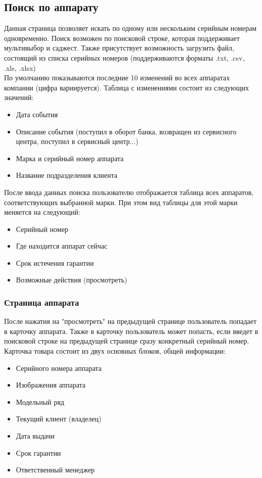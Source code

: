 \documentclass[DIV=calc, paper=a4, fontsize=11pt]{scrartcl} %
\newcommand{\AcceptedFormats}{.txt, .csv, .xls, .xlsx}
\begin{document}
\subsection{Поиск по аппарату}
Данная страница позволяет искать по одному или нескольким серийным номерам одновременно. Поиск возможен по поисковой строке, которая поддерживает мультивыбор и саджест. Также присутствует возможность загрузить файл, состоящий из списка серийных номеров (поддерживаются форматы \AcceptedFormats)
\\[0.5cm]
По умолчанию показываются последние 10 изменений во всех аппаратах компании (цифра вариируется). Таблица с изменениями состоит из следующих значений:

\begin{itemize}
	\item Дата события
	\item Описание события (поступил в оборот банка, возвращен из сервисного центра, поступил в сервисный центр...)
	\item Марка и серийный номер аппарата
	\item Название подразделения клиента
\end{itemize}

После ввода данных поиска пользователю отображается таблица всех аппаратов, соответствующих выбранной марки. При этом вид таблицы для этой марки меняется на следующий:

\begin{itemize}
	\item Серийный номер
	\item Где находится аппарат сейчас
	\item Срок истечения гарантии
	\item Возможные действия (просмотреть)
\end{itemize}

\subsubsection{Страница аппарата}
После нажатия на "просмотреть" на предыдущей странице пользователь попадает в карточку аппарата. Также в карточку пользователь может попасть, если введет в поисковой строке на предыдущей странице сразу конкретный серийный номер.
\\[0.5cm]
Карточка товара состоит из двух основных блоков, общей информации:

\begin{itemize}
	\item Серийного номера аппарата
	\item Изображения аппарата
	\item Модельный ряд
	\item Текущий клиент (владелец)
	\item Дата выдачи
	\item Срок гарантии
	\item Ответственный менеджер
\end{itemize}
\end{document}
